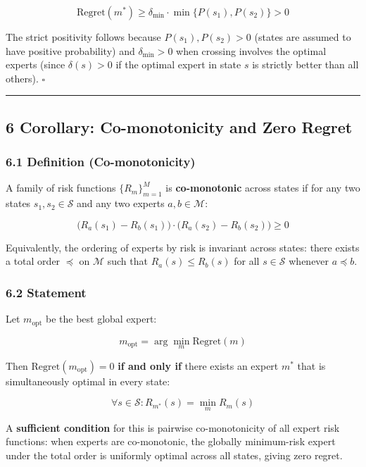 \documentclass[
  12pt,
]{article}
\begin{document}
\[\text{Regret}(m^*) \geq \delta_{\min} \cdot \min\{P(s_1), P(s_2)\} > 0\]

The strict positivity follows because \(P(s_1), P(s_2) > 0\) (states are
assumed to have positive probability) and \(\delta_{\min} > 0\) when
crossing involves the optimal experts (since \(\delta(s) > 0\) if the
optimal expert in state \(s\) is strictly better than all others).
\(\square\)

\begin{center}\rule{0.5\linewidth}{0.5pt}\end{center}

\subsection{6 Corollary: Co-monotonicity and Zero
Regret}\label{corollary-co-monotonicity-and-zero-regret}

\subsubsection{6.1 Definition
(Co-monotonicity)}\label{definition-co-monotonicity}

A family of risk functions \(\{R_m\}_{m=1}^M\) is \textbf{co-monotonic}
across states if for any two states \(s_1, s_2 \in \mathcal{S}\) and any
two experts \(a, b \in \mathcal{M}\):

\[\bigl(R_a(s_1) - R_b(s_1)\bigr) \cdot \bigl(R_a(s_2) - R_b(s_2)\bigr) \geq 0\]

Equivalently, the ordering of experts by risk is invariant across
states: there exists a total order \(\preceq\) on \(\mathcal{M}\) such
that \(R_a(s) \leq R_b(s)\) for all \(s \in \mathcal{S}\) whenever
\(a \preceq b\).

\subsubsection{6.2 Statement}\label{statement-2}

Let \(m_{\text{opt}}\) be the best global expert:

\[m_{\text{opt}} = \arg\min_{m} \text{Regret}(m)\]

Then \(\text{Regret}(m_{\text{opt}}) = 0\) \textbf{if and only if} there
exists an expert \(m^*\) that is simultaneously optimal in every state:

\[\forall s \in \mathcal{S} : R_{m^*}(s) = \min_{m} R_m(s)\]

A \textbf{sufficient condition} for this is pairwise co-monotonicity of
all expert risk functions: when experts are co-monotonic, the globally
minimum-risk expert under the total order is uniformly optimal across
all states, giving zero regret.
\end{document}
